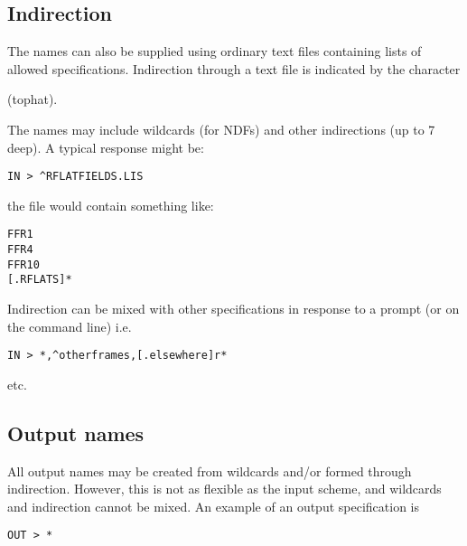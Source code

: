 \subsection{Indirection}
The names can also be supplied using ordinary text files containing
lists of allowed specifications. Indirection through a text file is
indicated by the character

\begin{description}
\item \hspace{13pt}{\bf$\wedge$}\hspace{3ex}(tophat).
\end{description}

The names may include wildcards (for NDFs) and other indirections (up to
7 deep). A typical response might be:
\begin{myquote}
\begin{verbatim}
IN > ^RFLATFIELDS.LIS
\end{verbatim}
\end{myquote}

the  file would contain something like:
\begin{myquote}
\begin{verbatim}
FFR1
FFR4
FFR10
[.RFLATS]*
\end{verbatim}
\end{myquote}

Indirection can be mixed with other specifications in response to a
prompt (or on the command line) i.e.
\begin{myquote}
\begin{verbatim}
IN > *,^otherframes,[.elsewhere]r*
\end{verbatim}
\end{myquote}
etc.

\subsection{Output names}

All output names may be created from wildcards and/or formed through 
indirection. However, this is not as flexible as the input scheme, 
and wildcards and indirection cannot be mixed. An example of an
output specification is
\begin{myquote}
\begin{verbatim}
OUT > *
\end{verbatim}
\end{myquote}

